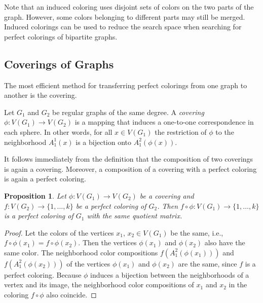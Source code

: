 \documentclass[11pt]{article}
\newtheorem{claim}{Proposition}[section]
\theoremstyle{definition}
\begin{document}
Note that an induced coloring uses disjoint sets of colors on the two parts of the graph. However, some colors belonging to different parts may still be merged. Induced colorings can be used to reduce the search space when searching for perfect colorings of bipartite graphs.









\subsection{Coverings of Graphs}\label{sec_cov}

The most efficient method for transferring perfect
colorings from one graph to another is the covering.

Let $G_1$ and $G_2$ be regular graphs of the same degree.
A {\sl covering} $\phi: V(G_1)\rightarrow V(G_2)$ is a mapping
 that induces a one-to-one correspondence  in each sphere.  In other words,  for all $ x\in V(G_1)$ 
 the restriction of $\phi$ to the neighborhood $A_1^1(x)$ is a bijection onto $A_1^2(\phi(x))$.

It follows immediately from the definition that the composition of two coverings is again a covering.
 Moreover, a composition of a covering with a perfect coloring is again a perfect coloring.

\begin{claim}\label{cover1}
Let $\phi: V(G_1)\rightarrow V(G_2)$ be a covering and
$f: V(G_2)\rightarrow \{1,\ldots,k\}$ be a perfect coloring of $G_2$.
Then $f\circ\phi: V(G_1)\rightarrow\{1,\ldots,k\}$ is a perfect coloring of $G_1$ with the same quotient matrix.
\end{claim}
\begin{proof}
Let the colors of the vertices $x_1$, $x_2\in V(G_1)$ be the same, i.e., $f\circ\phi(x_1)=f\circ\phi(x_2)$.
Then the vertices $\phi(x_1)$ and $\phi(x_2)$ also have the same color.
The  neighborhood color compositions $f(A_1^2(\phi(x_1)))$ and  $f(A_1^2(\phi(x_2)))$ of the vertices $\phi(x_1)$ and $\phi(x_2)$ 
are the same, since $f$ is a perfect coloring.
Because $\phi$ induces a bijection between the neighborhoods of a vertex and its image,
the  neighborhood color compositions of $x_1$ and $x_2$ in the coloring $f\circ\phi$ also coincide. 
\end{proof}
\end{document}
